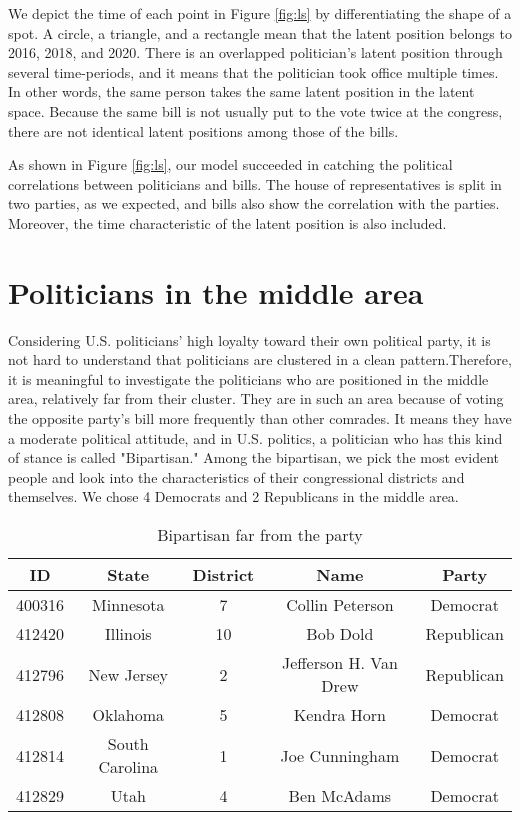 \documentclass[a4paper, 11pt]{report}
\begin{document}
\quad We depict the time of each point in Figure \ref{fig:ls} by differentiating the shape of a spot. A circle, a triangle, and a rectangle mean that the latent position belongs to 2016, 2018, and 2020. There is an overlapped politician's latent position through several time-periods, and it means that the politician took office multiple times. In other words, the same person takes the same latent position in the latent space. Because the same bill is not usually put to the vote twice at the congress, there are not identical latent positions among those of the bills.

\quad As shown in Figure \ref{fig:ls}, our model succeeded in catching the political correlations between politicians and bills. The house of representatives is split in two parties, as we expected, and bills also show the correlation with the parties. Moreover, the time characteristic of the latent position is also included.

\section{Politicians in the middle area}

\quad Considering U.S. politicians' high loyalty toward their own political party, it is not hard to understand that politicians are clustered in a clean pattern.Therefore, it is meaningful to investigate the politicians who are positioned in the middle area, relatively far from their cluster. They are in such an area because of voting the opposite party's bill more frequently than other comrades. It means they have a moderate political attitude, and in U.S. politics, a politician who has this kind of stance is called "Bipartisan." Among the bipartisan, we pick the most evident people and look into the characteristics of their congressional districts and themselves. We chose 4 Democrats and 2 Republicans in the middle area. 

\begin{table}[h!]
\centering
    \begin{tabular}{c | c | c | c | c}
        ID & State & District & Name & Party  \\
        \hline \hline
        400316 & Minnesota & 7 & Collin Peterson & Democrat \\
        412420 & Illinois & 10 & Bob Dold & Republican \\
        412796 & New Jersey & 2 & Jefferson H. Van Drew & Republican  \\
        412808 & Oklahoma & 5 & Kendra Horn & Democrat  \\
        412814 & South Carolina & 1 & Joe Cunningham & Democrat  \\
        412829 & Utah & 4 & Ben McAdams & Democrat  \\
    \end{tabular}
    \caption{Bipartisan far from the party}
    \label{tab:data}
\end{table}
\end{document}
